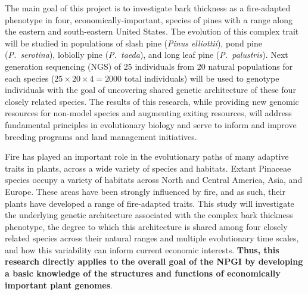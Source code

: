 


The main goal of this project is to investigate bark thickness as a fire-adapted phenotype in four, economically-important, 
species of pines with a range along the eastern and south-eastern United States.  The evolution of this complex trait will 
be studied in populations of slash pine (\textit{Pinus elliottii}), pond pine (\textit{P.\ serotina}), loblolly pine (\textit{P.\ taeda}), 
and long leaf pine (\textit{P.\ palustris}).  Next generation sequencing (NGS) of 25 individuals from 20 natural populations for each 
species ($25 \times 20 \times 4 = 2000$ total individuals) will be used to genotype individuals with the goal of uncovering shared 
genetic architecture of these four closely related species. The results of this research, while providing new genomic 
resources for non-model species and augmenting exiting resources, will address fundamental principles in 
evolutionary biology and serve to inform and improve breeding programs and land management initiatives.

Fire has played an important role in the evolutionary paths of many adaptive traits in plants, across a wide variety of species 
and habitats.  Extant Pinaceae species occupy a variety of habitats across North and Central America, Asia, and Europe.  
These areas have been strongly influenced by fire, and as such, their plants have developed a range 
of fire-adapted traits.  This study will investigate the underlying genetic architecture associated with the complex 
bark thickness phenotype, the degree to which this architecture is shared among four closely related species across their natural 
ranges and multiple evolutionary time scales, and how this variability can inform current economic interests.  \textbf{Thus, this research 
directly applies to the overall goal of the NPGI by developing a basic knowledge of the structures and functions of economically 
important plant genomes}.



